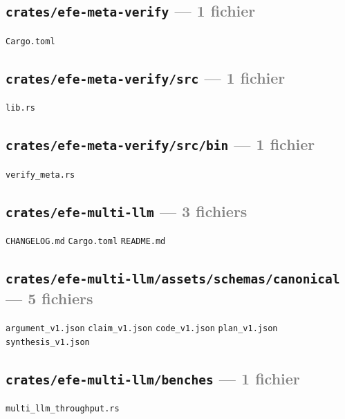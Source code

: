 \documentclass[10pt]{report}
\newcommand{\code}[1]{\texttt{\small #1}}
\begin{document}
\subsection*{\code{crates/efe-meta-verify} \normalfont\textcolor{grey}{--- 1 fichier}}
\begin{sloppypar}\footnotesize\raggedright
\code{Cargo.toml}
\end{sloppypar}

\subsection*{\code{crates/efe-meta-verify/src} \normalfont\textcolor{grey}{--- 1 fichier}}
\begin{sloppypar}\footnotesize\raggedright
\code{lib.rs}
\end{sloppypar}

\subsection*{\code{crates/efe-meta-verify/src/bin} \normalfont\textcolor{grey}{--- 1 fichier}}
\begin{sloppypar}\footnotesize\raggedright
\code{verify\_meta.rs}
\end{sloppypar}

\subsection*{\code{crates/efe-multi-llm} \normalfont\textcolor{grey}{--- 3 fichiers}}
\begin{sloppypar}\footnotesize\raggedright
\code{CHANGELOG.md} \;\textbullet\; \code{Cargo.toml} \;\textbullet\; \code{README.md}
\end{sloppypar}

\subsection*{\code{crates/efe-multi-llm/assets/schemas/canonical} \normalfont\textcolor{grey}{--- 5 fichiers}}
\begin{sloppypar}\footnotesize\raggedright
\code{argument\_v1.json} \;\textbullet\; \code{claim\_v1.json} \;\textbullet\; \code{code\_v1.json} \;\textbullet\; \code{plan\_v1.json} \;\textbullet\; \code{synthesis\_v1.json}
\end{sloppypar}

\subsection*{\code{crates/efe-multi-llm/benches} \normalfont\textcolor{grey}{--- 1 fichier}}
\begin{sloppypar}\footnotesize\raggedright
\code{multi\_llm\_throughput.rs}
\end{sloppypar}
\end{document}
